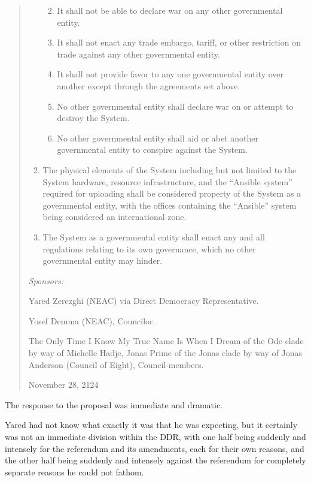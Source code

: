 \begin{quote}
\begin{enumerate}
  \begin{enumerate}
  \def\labelenumii{\arabic{enumii}.}
  \tightlist
  \item
    It shall not be able to declare war on any other governmental entity.
  \item
    It shall not enact any trade embargo, tariff, or other restriction on trade against any other governmental entity.
  \item
    It shall not provide favor to any one governmental entity over another except through the agreements set above.
  \item
    No other governmental entity shall declare war on or attempt to destroy the System.
  \item
    No other governmental entity shall aid or abet another governmental entity to conspire against the System.
  \end{enumerate}
\item
  The physical elements of the System including but not limited to the System hardware, resource infrastructure, and the ``Ansible system'' required for uploading shall be considered property of the System as a governmental entity, with the offices containing the ``Ansible'' system being considered an international zone.
\item
  The System as a governmental entity shall enact any and all regulations relating to its own governance, which no other governmental entity may hinder.
\end{enumerate}

\emph{Sponsors:}

\begin{description}
\tightlist
\item[Direct Democracy Representative signatory]
Yared Zerezghi (NEAC) via Direct Democracy Representative.
\item[Supervisory government signatory]
Yosef Demma (NEAC), Councilor.
\item[System-side signatories]
The Only Time I Know My True Name Is When I Dream of the Ode clade by way of Michelle Hadje, Jonas Prime of the Jonas clade by way of Jonas Anderson (Council of Eight), Council-members.
\end{description}

November 28, 2124
\end{quote}

The response to the proposal was immediate and dramatic.

Yared had not know what exactly it was that he was expecting, but it certainly was not an immediate division within the DDR, with one half being suddenly and intensely for the referendum and its amendments, each for their own reasons, and the other half being suddenly and intensely against the referendum for completely separate reasons he could not fathom.

